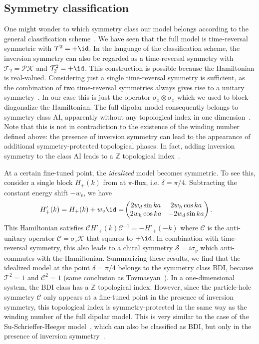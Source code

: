 \subsection{Symmetry classification}
One might wonder to which symmetry class our model belongs according to the general classification scheme~\cite{Schnyder2008,Kitaev2009,Ryu2010}.
We have seen that the full model is time-reversal symmetric with $\mathcal{T}^2 = + \id$.
In the language of the classification scheme, the inversion symmetry can also be regarded as a time-reversal symmetry with $\mathcal{T}_2 = \mathcal{P} \mathcal{K}$ and $\mathcal{T}^2_2 = +\id$.
This construction is possible because the Hamiltonian is real-valued.
Considering just a single time-reversal symmetry is sufficient, as the combination of two time-reversal symmetries always gives rise to a unitary symmetry~\cite{Ryu2010}.
In our case this is just the operator $\sigma_x \otimes \sigma_x$ which we used to block-diagonalize the Hamiltonian.
The full dipolar model consequently belongs to symmetry class AI, apparently without any topological index in one dimension~\cite{Schnyder2008,Kitaev2009,Ryu2010}.
Note that this is not in contradiction to the existence of the winding number defined above: the presence of inversion symmetry can lead to the appearance of additional symmetry-protected topological phases.
In fact, adding inversion symmetry to the class AI leads to a $\mathbb{Z}$ topological index~\cite{Chiu2014,Lu2014}.

At a certain fine-tuned point, the \emph{idealized} model becomes  symmetric.
To see this, consider a single block $H_+(k)$ from  at $\pi$-flux, i.e. $\delta = \pi/4$. Subtracting the constant energy shift $-w_v$, we have
\begin{align}
    H'_+(k) = H_+(k) + w_v \id = &\begin{pmatrix}
        2w_d \sin ka &   2w_h \cos ka \\
        2w_h \cos ka & - 2w_d \sin ka
    \end{pmatrix}.
\end{align}
This Hamiltonian satisfies $\mathcal{C}H'_+(k)\mathcal{C}^{-1}= -H'_+(-k)$ where $\mathcal{C}$ is the anti-unitary operator $\mathcal{C}= \sigma_z \mathcal{K}$ that squares to $+\id$.
In combination with time-reversal symmetry, this also leads to a chiral symmetry $\mathcal{S} = i\sigma_y$ which anti-commutes with the Hamiltonian.
Summarizing these results, we find that the idealized model at the point $\delta=\pi/4$ belongs to the symmetry class BDI, because $\mathcal{T}^2=1$ and $\mathcal{C}^2=1$ (same conclusion as Tovmasyan~\cite{Tovmasyan2013a}).
In a one-dimensional system, the BDI class has a $\mathbb{Z}$ topological index.
However, since the  particle-hole symmetry $\mathcal{C}$ only appears at a fine-tuned point in the presence of inversion symmetry, this topological index is symmetry-protected in the same way as the winding number of the full dipolar model.
This is very similar to the case of the Su-Schrieffer-Heeger model~\cite{Su1979}, which can also be classified as BDI, but only in the presence of inversion symmetry~\cite{Wang2013}.


